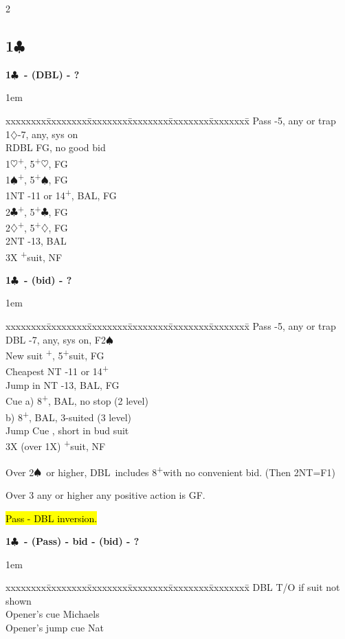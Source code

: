 \documentclass[10pt]{article}
\renewcommand{\c}{$\clubsuit$}
\renewcommand{\d}{$\diamondsuit$}
\newcommand{\h}{$\heartsuit$}
\newcommand{\s}{$\spadesuit$}
\newcommand{\p}{\textsuperscript{+}}
\newcommand{\x}{DBL}
\newcommand{\xx}{RDBL}
\newenvironment{bidtable}[1][]
{\textbf{#1}
  \begin{adjustwidth}{1em}{}
    \addvspace{2pt}
    \begin{tabbing}
      xxxxxxxx\=xxxxxxxx\=xxxxxxxx\=xxxxxxxx\=xxxxxxxx\=xxxxxxxx\=\kill}
{\end{tabbing}\end{adjustwidth}\bigskip}%
\newcommand{\pdfc}{\texorpdfstring{\c{}}{C}}
\begin{document}
\begin{multicols*}{2}
\subsection{1\pdfc}
\begin{bidtable}[1\c\ - (\x) - ?]
Pass -5, any or trap                   \\
1\d  {}-7, any, sys on                   \\
\xx  \> FG, no good bid       \\
1\h  {}\p, 5\p\h, FG        \\
1\s  {}\p, 5\p\s, FG        \\
1NT  -11 or 14\p, BAL, FG \\
2\c  {}\p, 5\p\c, FG        \\
2\d  {}\p, 5\p\d, FG            \\
2NT  -13, BAL            \\
3X   \p suit, NF
\end{bidtable}

\begin{bidtable}[1\c\ - (bid) - ?]
Pass         \>  -5, any or trap                \\
\x           \>  -7, any, sys on, F2\s                \\
New suit     \>  \p, 5\p suit, FG               \\
Cheapest NT  \>  -11 or 14\p                    \\
Jump in NT   \>  -13, BAL, FG                  \\
Cue          \>  \> a) 8\p, BAL, no stop (2 level)  \\
             \>  \> b) 8\p, BAL, 3-suited (3 level) \\
Jump Cue     \>  , short in bud suit         \\
3X (over 1X) \>  \p suit, NF
\end{bidtable}

Over 2\s\ or higher, \x\ includes 8\p with no convenient bid. (Then 2NT=F1)

Over 3 any or higher any positive action is GF.

\hl{Pass - DBL inversion.}

\begin{bidtable}[1\c\ - (Pass) - bid - (bid) - ?]
\x                \>  \> T/O if suit not shown \\
Opener's cue      \>  \> Michaels              \\
Opener's jump cue \>  \> Nat
\end{bidtable}


\end{multicols*}
\end{document}
